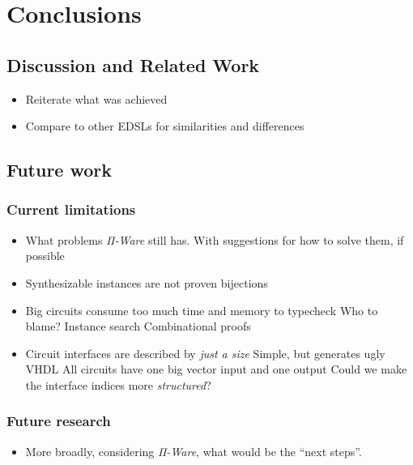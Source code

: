 \chapter{Conclusions}
\label{chap:conclusions}

    \section{Discussion and Related Work}
    \label{sec:related-work}
        \begin{itemize}
            \item Reiterate what was achieved
            \item Compare to other \acp{EDSL} for similarities and differences
        \end{itemize}


    \section{Future work}
    \label{sec:future-work}

        \subsection{Current limitations}
        \label{subsec:current-limitations}
            \begin{itemize}
                \item What problems \emph{Π-Ware} still has.
                    \subitem With suggestions for how to solve them, if possible
                \item Synthesizable instances are not proven bijections
                \item Big circuits consume too much time and memory to typecheck
                    \subitem Who to blame?
                    \subitem Instance search
                    \subitem Combinational proofs
                \item Circuit interfaces are described by \emph{just a size}
                    \subitem Simple, but generates ugly VHDL
                    \subitem All circuits have one big vector input and one output
                    \subitem Could we make the interface indices more \emph{structured}?
            \end{itemize}

        \subsection{Future research}
        \label{subsec:future-research}
            \begin{itemize}
                \item More broadly, considering \emph{Π-Ware}, what would be the ``next steps''.
            \end{itemize}

